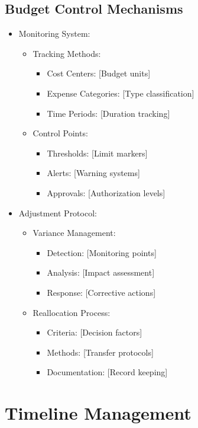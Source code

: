 \documentclass{article}
\begin{document}
\subsection{Budget Control Mechanisms}
\begin{itemize}
    \item Monitoring System:
    \begin{itemize}
        \item Tracking Methods:
        \begin{itemize}
            \item Cost Centers: [Budget units]
            \item Expense Categories: [Type classification]
            \item Time Periods: [Duration tracking]
        \end{itemize}
        \item Control Points:
        \begin{itemize}
            \item Thresholds: [Limit markers]
            \item Alerts: [Warning systems]
            \item Approvals: [Authorization levels]
        \end{itemize}
    \end{itemize}
    \item Adjustment Protocol:
    \begin{itemize}
        \item Variance Management:
        \begin{itemize}
            \item Detection: [Monitoring points]
            \item Analysis: [Impact assessment]
            \item Response: [Corrective actions]
        \end{itemize}
        \item Reallocation Process:
        \begin{itemize}
            \item Criteria: [Decision factors]
            \item Methods: [Transfer protocols]
            \item Documentation: [Record keeping]
        \end{itemize}
    \end{itemize}
\end{itemize}
\section{Timeline Management}
\end{document}
